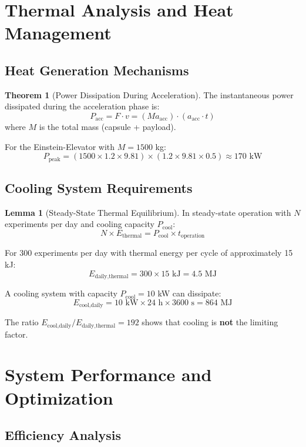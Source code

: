 ﻿\documentclass[a4paper,12pt]{article}
\theoremstyle{definition}
\newtheorem{theorem}{Theorem}
\newtheorem{lemma}{Lemma}
\begin{document}
\section{Thermal Analysis and Heat Management}

\subsection{Heat Generation Mechanisms}

\begin{theorem}[Power Dissipation During Acceleration]
The instantaneous power dissipated during the acceleration phase is:
\[
P_{\text{acc}} = F \cdot v = (M a_{\text{acc}}) \cdot (a_{\text{acc}} \cdot t)
\]
where $M$ is the total mass (capsule + payload).
\end{theorem}

For the Einstein-Elevator with $M = 1500$ kg:
\[
P_{\text{peak}} = (1500 \times 1.2 \times 9.81) \times (1.2 \times 9.81 \times 0.5) \approx 170 \text{ kW}
\]

\subsection{Cooling System Requirements}

\begin{lemma}[Steady-State Thermal Equilibrium]
In steady-state operation with $N$ experiments per day and cooling capacity $P_{\text{cool}}$:
\[
N \times E_{\text{thermal}} = P_{\text{cool}} \times t_{\text{operation}}
\]
\end{lemma}

For 300 experiments per day with thermal energy per cycle of approximately 15 kJ:
\[
E_{\text{daily,thermal}} = 300 \times 15 \text{ kJ} = 4.5 \text{ MJ}
\]

A cooling system with capacity $P_{\text{cool}} = 10$ kW can dissipate:
\[
E_{\text{cool,daily}} = 10 \text{ kW} \times 24 \text{ h} \times 3600 \text{ s} = 864 \text{ MJ}
\]

The ratio $E_{\text{cool,daily}} / E_{\text{daily,thermal}} = 192$ shows that cooling is \textbf{not} the limiting factor.

\section{System Performance and Optimization}

\subsection{Efficiency Analysis}
\end{document}
